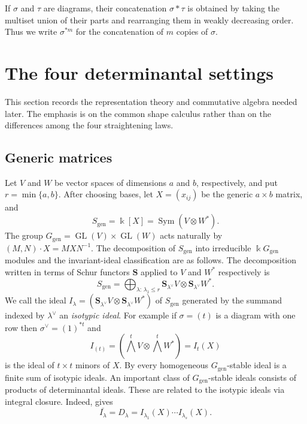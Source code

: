 \documentclass[11pt,reqno]{amsart}
\numberwithin{equation}{subsection}
\theoremstyle{definition}
\theoremstyle{remark}
\DeclareMathOperator{\GL}{GL}
\DeclareMathOperator{\Sym}{Sym}
\newcommand{\kfield}{\Bbbk}
\newcommand{\Schur}{\mathbf S}
\begin{document}
If $\sigma$ and $\tau$ are diagrams, their concatenation
$\sigma*\tau$ is obtained by taking the multiset union of their parts and rearranging them in weakly decreasing order.  Thus
we write $\sigma^{*m}$ for the concatenation of $m$ copies of $\sigma$.

\section{The four determinantal settings}\label{sec:package}

This section records the representation theory and commutative algebra
needed later.  The emphasis is on the common shape calculus rather than
on the differences among the four straightening laws.

\subsection{Generic matrices}

Let $V$ and $W$ be vector spaces of dimensions $a$ and $b$,
respectively, and put $r=\min\{a,b\}$.  After choosing bases, let
$X=(x_{ij})$ be the generic $a\times b$ matrix, and
\[
 S_{\mathrm{gen}}=\kfield[X]
 =\Sym(V\otimes W^*).
\]
The group $G_{\mathrm{gen}}=\GL(V)\times\GL(W)$ acts naturally by $(M,N)\cdot X=MXN^{-1}$.  The  decomposition of  $S_{\mathrm{gen}}$ into irreducible $\kfield G_{\mathrm{gen}}$ modules and the invariant-ideal classification are as follows.
The decomposition written in terms of Schur functors  $\Schur$ applied to $V$ and $W^*$ respectively  is
\begin{equation}\label{eq:cauchy}
 S_{\mathrm{gen}}
 =\bigoplus_{\lambda:\,\lambda_1\le r}
 \Schur_{\lambda^\vee} V\otimes\Schur_{\lambda^\vee} W^*.
\end{equation}
We call the ideal $I_\lambda=( \Schur_{\lambda^\vee} V\otimes\Schur_{\lambda^\vee} W^*)$ of $S_{\mathrm{gen}}$ generated by the summand indexed
by $\lambda^\vee$ an {\em isotypic ideal}. For example if $\sigma=(t)$ is a diagram with one row then $\sigma^\vee=(1)^{*t}$ and  
\[
I_{(t)}=\left(\bigwedge^t V\otimes \bigwedge^t W^*\right)=I_t(X)
\] is the ideal of $t\times t$ minors of $X$.
By \cite[Theorem~4.1 and Proposition~5.1]{DEP} every homogeneous $G_{\mathrm{gen}}$-stable
ideal is a finite sum of  isotypic ideals. An important class of $G_{\mathrm{gen}}$-stable ideals consists of products of determinantal ideals. These are related to the isotypic ideals via integral closure. Indeed, 
\cite[Theorems~8.1]{DEP}  gives
\begin{equation}\label{eq:generic-isotypic-closure}
\overline{I_\lambda}
 =D_{\lambda}
 =I_{\lambda_1}(X)\cdots
 I_{\lambda_s}(X).
\end{equation}
\end{document}
